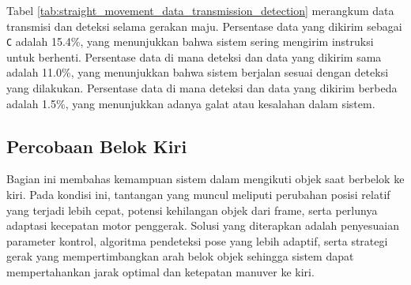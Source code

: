 Tabel \ref{tab:straight_movement_data_transmission_detection} merangkum data transmisi dan deteksi selama gerakan maju. Persentase data yang dikirim sebagai \texttt{C} adalah 15.4\%, yang menunjukkan bahwa sistem sering mengirim instruksi untuk berhenti. Persentase data di mana deteksi dan data yang dikirim sama adalah 11.0\%, yang menunjukkan bahwa sistem berjalan sesuai dengan deteksi yang dilakukan. Persentase data di mana deteksi dan data yang dikirim berbeda adalah 1.5\%, yang menunjukkan adanya galat atau kesalahan dalam sistem.

\newpage
\subsection{Percobaan Belok Kiri}
\label{subsec:percobaanbelokkiri}

Bagian ini membahas kemampuan sistem dalam mengikuti objek saat berbelok ke kiri. Pada kondisi ini, tantangan yang muncul meliputi perubahan posisi relatif yang terjadi lebih cepat, potensi kehilangan objek dari frame, serta perlunya adaptasi kecepatan motor penggerak. Solusi yang diterapkan adalah penyesuaian parameter kontrol, algoritma pendeteksi pose yang lebih adaptif, serta strategi gerak yang mempertimbangkan arah belok objek sehingga sistem dapat mempertahankan jarak optimal dan ketepatan manuver ke kiri.

